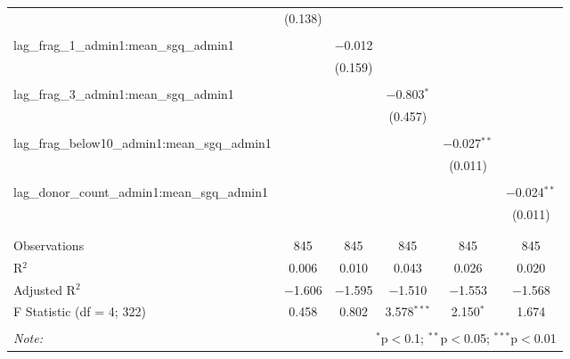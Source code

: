 \begin{table}[!htbp]
\begin{tabular}{@{\extracolsep{5pt}}lccccc}
  & (0.138) &  &  &  &  \\ 
  & & & & & \\ 
 lag\_frag\_1\_admin1:mean\_sgq\_admin1 &  & $-$0.012 &  &  &  \\ 
  &  & (0.159) &  &  &  \\ 
  & & & & & \\ 
 lag\_frag\_3\_admin1:mean\_sgq\_admin1 &  &  & $-$0.803$^{*}$ &  &  \\ 
  &  &  & (0.457) &  &  \\ 
  & & & & & \\ 
 lag\_frag\_below10\_admin1:mean\_sgq\_admin1 &  &  &  & $-$0.027$^{**}$ &  \\ 
  &  &  &  & (0.011) &  \\ 
  & & & & & \\ 
 lag\_donor\_count\_admin1:mean\_sgq\_admin1 &  &  &  &  & $-$0.024$^{**}$ \\ 
  &  &  &  &  & (0.011) \\ 
  & & & & & \\ 
\hline \\[-1.8ex] 
Observations & 845 & 845 & 845 & 845 & 845 \\ 
R$^{2}$ & 0.006 & 0.010 & 0.043 & 0.026 & 0.020 \\ 
Adjusted R$^{2}$ & $-$1.606 & $-$1.595 & $-$1.510 & $-$1.553 & $-$1.568 \\ 
F Statistic (df = 4; 322) & 0.458 & 0.802 & 3.578$^{***}$ & 2.150$^{*}$ & 1.674 \\ 
\hline 
\hline \\[-1.8ex] 
\textit{Note:}  & \multicolumn{5}{r}{$^{*}$p$<$0.1; $^{**}$p$<$0.05; $^{***}$p$<$0.01} \\ 
\end{tabular} 
\end{table} 
